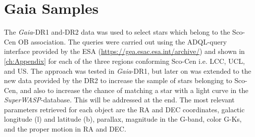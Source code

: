 \section{Gaia Samples}

The \textit{Gaia}-DR1 and-DR2 data was used to select stars which belong to the Sco-Cen OB association. The queries were carried out using the ADQL-query interface provided by the ESA (\url{https://gea.esac.esa.int/archive/}) and shown in \autoref{ch:Appendix} for each of the three regions conforming Sco-Cen i.e. LCC, UCL, and US. The approach was tested in \textit{Gaia}-DR1, but later on was extended to the new data provided by the DR2 to increase the sample of stars belonging to Sco-Cen, and also to increase the chance of matching a star with a light curve in the \textit{SuperWASP}-database. This will be addressed at the end. The most relevant parameters retrieved for each object are the RA and DEC coordinates, galactic longitude (l) and latitude (b), parallax, magnitude in the G-band, color G-Ks, and the proper motion in RA and DEC.\\    

